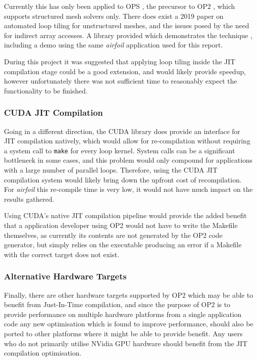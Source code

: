 Currently this has only been applied to OPS \cite{opstiling}, the precursor to OP2 \cite{opsmain}, which supports structured mesh solvers only. There does exist a 2019 paper \cite{slope} on automated loop tiling for unstructured meshes, and the issues posed by the need for indirect array accesses. A library provided which demonstrates the technique \cite{SLOPErep}, including a demo using the same \textit{airfoil} application used for this report.
\par
During this project it was suggested that applying loop tiling inside the JIT compilation stage could be a good extension, and would likely provide speedup, however unfortunately there was not sufficient time to reasonably expect the functionality to be finished.

\subsubsection{CUDA JIT Compilation}
Going in a different direction, the CUDA library does provide an interface for JIT compilation natively, which would allow for re-compilation without requiring a system call to \verb|make| for every loop kernel. System calls can be a significant bottleneck in some cases, and this problem would only compound for applications with a large number of parallel loops. Therefore, using the CUDA JIT compilation system would likely bring down the upfront cost of recompilation. For \textit{airfoil} this re-compile time is very low, it would not have much impact on the results gathered.
\par
Using CUDA's native JIT compilation pipeline would provide the added benefit that a application developer using OP2 would not have to write the Makefile themselves, as currently its contents are not generated by the OP2 code generator, but simply relies on the executable producing an error if a Makefile with the correct target does not exist.

\subsubsection{Alternative Hardware Targets}
Finally, there are other hardware targets supported by OP2 which may be able to benefit from Just-In-Time compilation, and since the purpose of OP2 is to provide performance on multiple hardware platforms from a single application code any new optimisation which is found to improve performance, should also be ported to other platforms where it might be able to provide benefit. Any users who do not  primarily utilise NVidia GPU hardware should benefit from the JIT compilation optimisation.

